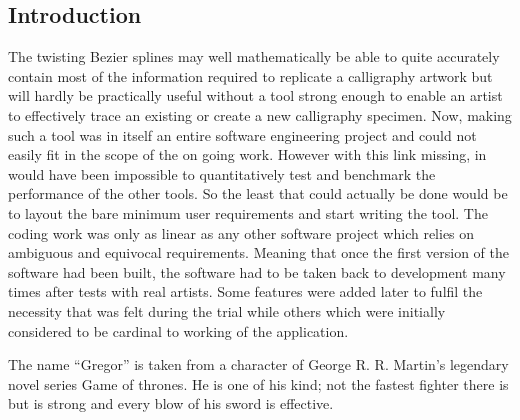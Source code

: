 \subsection{Introduction}
{
    The twisting Bezier splines may well mathematically be able to quite accurately contain most of the information required to replicate a calligraphy artwork but will hardly be practically useful without a tool strong enough to enable an artist to effectively trace an existing or create a new calligraphy specimen. Now, making such a tool was in itself an entire software engineering project and could not easily fit in the scope of the on going work. However with this link missing, in would have been impossible to quantitatively test and benchmark the performance of the other tools. So the least that could actually be done would be to layout the bare minimum user requirements and start writing the tool. The coding work was only as linear as any other software project which relies on ambiguous and equivocal requirements. Meaning that once the first version of the software had been built, the software had to be taken back to development many times after tests with real artists. Some features were added later to fulfil the necessity that was felt during the trial while others which were initially considered to be cardinal to working of the application.

    The name ``Gregor'' is taken from a character of George R. R. Martin's legendary novel\cite{bib19} series Game of thrones. He is one of his kind; not the fastest fighter there is but is strong and every blow of his sword is effective.

}
